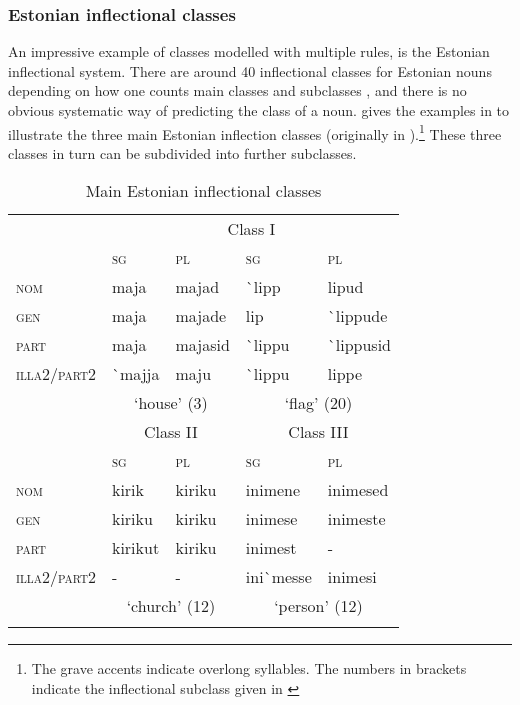 \subsubsection{Estonian inflectional classes}

An impressive example of classes modelled with multiple rules, is the Estonian inflectional system. There are around 40 inflectional classes for Estonian nouns depending on how one counts main classes and subclasses \autocites{Erelt.1995, Erelt.1997, Murk.1997, Blevins.2008}, and there is no obvious systematic way of predicting the class of a noun. \textcite[242]{Blevins.2008} gives the examples in  to illustrate the three main Estonian inflection classes (originally in \citealt{Erelt.2001}).\footnote{The grave accents indicate overlong syllables. The numbers in brackets indicate the inflectional subclass given in \autocite{Erelt.2001}} These three classes in turn can be subdivided into further subclasses.


\begin{table}
    \caption{Main Estonian inflectional classes}\label{tab:estonian-classes}
    \centering
    \begin{tabular}{lllll}
      \lsptoprule
      & \multicolumn{4}{c}{Class I}  \\

      & \textsc{sg}     & \textsc{pl} & \textsc{sg}  & \textsc{pl}          \\
      \midrule
      \textsc{nom}         & maja      & majad   & \`{}lipp  & lipud         \\
      \textsc{gen}         & maja      & majade  & lip       & \`{}lippude   \\
      \textsc{part}        & maja      & majasid & \`{}lippu & \`{}lippusid  \\
      \textsc{illa2/part2} & \`{}majja & maju    & \`{}lippu & lippe         \\
      \midrule
      & \multicolumn{2}{c}{`house' (3)} & \multicolumn{2}{c}{`flag' (20)}\\
      \midrule
      & \multicolumn{2}{c}{Class II} & \multicolumn{2}{c}{Class III}\\
      & \textsc{sg}     & \textsc{pl} & \textsc{sg}  & \textsc{pl}          \\
      \midrule
      \textsc{nom}         & kirik   & kiriku & inimene      & inimesed\\
      \textsc{gen}         & kiriku  & kiriku & inimese      & inimeste\\
      \textsc{part}        & kirikut & kiriku & inimest      & -       \\
      \textsc{illa2/part2} & -       & -      & ini\`{}messe & inimesi \\
      \midrule
       & \multicolumn{2}{c}{`church' (12)} & \multicolumn{2}{c}{`person' (12)} \\
      \lspbottomrule
  \end{tabular}
\end{table}

